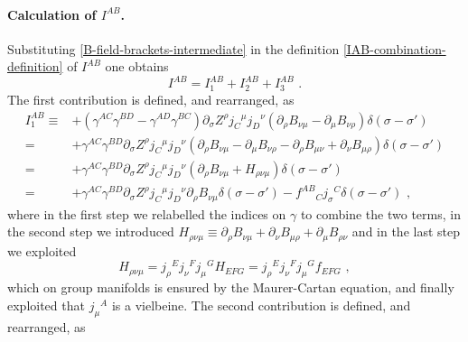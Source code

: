 \documentclass[12pt]{article}
\numberwithin{equation}{section}
\begin{document}
\paragraph{Calculation of $I^{AB}$.} Substituting \eqref{B-field-brackets-intermediate} in the definition \eqref{IAB-combination-definition} of $I^{AB}$ one obtains
\begin{equation}
I^{AB}= I^{AB}_{1}+I^{AB}_{2}+I^{AB}_{3} \,\, .
\end{equation}
The first contribution is defined, and rearranged, as
\begin{equation}
\begin{aligned}
I^{AB}_{1}\equiv &+(\gamma^{AC}\gamma^{BD}-\gamma^{AD}\gamma^{BC})\partial_{\sigma}Z^{\rho}j_{C}{}^{\mu}j_{D}{}^{\nu}(\partial_{\rho}B_{\nu\mu}-\partial_{\mu}B_{\nu\rho})\delta(\sigma-\sigma')
\\
=&+\gamma^{AC}\gamma^{BD}\partial_{\sigma}Z^{\rho}j_{C}{}^{\mu}j_{D}{}^{\nu}(\partial_{\rho}B_{\nu\mu}-\partial_{\mu}B_{\nu\rho}-\partial_{\rho}B_{\mu\nu}+\partial_{\nu}B_{\mu\rho})\delta(\sigma-\sigma')
\\
=&+\gamma^{AC}\gamma^{BD}\partial_{\sigma}Z^{\rho}j_{C}{}^{\mu}j_{D}{}^{\nu}(\partial_{\rho}B_{\nu\mu}+H_{\rho\nu\mu})\delta(\sigma-\sigma')
\\
=&+\gamma^{AC}\gamma^{BD}\partial_{\sigma}Z^{\rho}j_{C}{}^{\mu}j_{D}{}^{\nu}\partial_{\rho}B_{\nu\mu}\delta(\sigma-\sigma')-f^{AB}{}_{C}j_{\sigma}{}^{C}\delta(\sigma-\sigma') \,\, ,
\end{aligned}
\end{equation}
where in the first step we relabelled the indices on $\gamma$ to combine the two terms, in the second step we introduced $H_{\rho\nu\mu}\equiv \partial_{\rho}B_{\nu\mu}+\partial_{\nu}B_{\mu\rho}+\partial_{\mu}B_{\rho\nu}$ and in the last step we exploited
\begin{equation}
H_{\rho\nu\mu}=j_{\rho}{}^{E}j_{\nu}{}^{F}j_{\mu}{}^{G}H_{EFG}=j_{\rho}{}^{E}j_{\nu}{}^{F}j_{\mu}{}^{G}f_{EFG} \,\, ,
\end{equation}
which on group manifolds is ensured by the Maurer-Cartan equation, and finally exploited that $j_{\mu}{}^{A}$ is a vielbeine. The second contribution is defined, and rearranged, as
\end{document}
